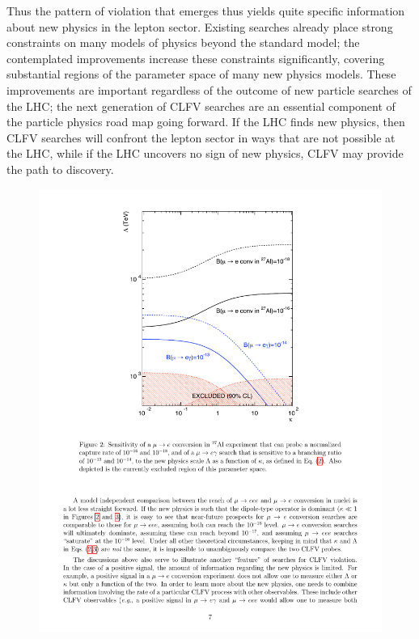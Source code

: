 Thus the pattern of violation that emerges thus yields quite specific information about new physics in the lepton sector. Existing searches already place strong constraints on
many models of physics beyond the standard model; the contemplated improvements increase these constraints significantly, covering substantial regions of the parameter space of many new physics models.
These improvements are important regardless of the outcome of new particle searches of the
LHC; the next generation of CLFV searches are an essential
component of the particle physics road map going forward.  If the LHC finds new
physics, then CLFV searches will confront the lepton sector in ways
that are not possible at the LHC, while if the LHC uncovers no sign of
new physics, CLFV may provide the path to discovery.

\begin{figure}[ht]
\begin{minipage}[b]{0.48\linewidth}
\centering
\includegraphics[trim = 45mm 130mm 50mm 10mm, clip, width=\linewidth]{ChargedLeptons/Figures/Page7.pdf}

\end{minipage}
\end{figure}
